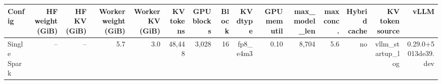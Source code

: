 \begin{tabular}{l r r r r r r r r r r r r r r }
\toprule
Config & HF weight (GiB) & HF KV (GiB) & Worker weight (GiB) & Worker KV (GiB) & KV tokens & GPU blocks & Block & KV dtype & GPU mem util & max\_model\_len & max conc. & Hybrid cache & KV token source & vLLM \\
\midrule
Single Spark & -- & -- & 5.7 & 3.0 & 48,448 & 3,028 & 16 & fp8\_e4m3 & 0.10 & 8,704 & 5.6 & no & vllm\_startup\_log & 0.29.0+5013de39.dev \\
\bottomrule
\end{tabular}
